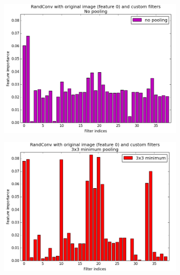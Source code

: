 \documentclass[a4paper]{report}
\begin{document}
	
	\begin{figure}
		\begin{subfigure}{.5\textwidth}
			\centering
			\includegraphics[width=1.\linewidth]{images/FIPoolNo.png}
			\caption{\label{fig:FIPoolNo}}
		\end{subfigure}%
		\begin{subfigure}{.5\textwidth}
			\centering
			\includegraphics[width=1.\linewidth]{images/FIPoolMin.png}
			\caption{\label{fig:FIPoolMin}}
		\end{subfigure}
		\begin{subfigure}{.5\textwidth}
			\centering

\end{subfigure}
\end{figure}
\end{document}
